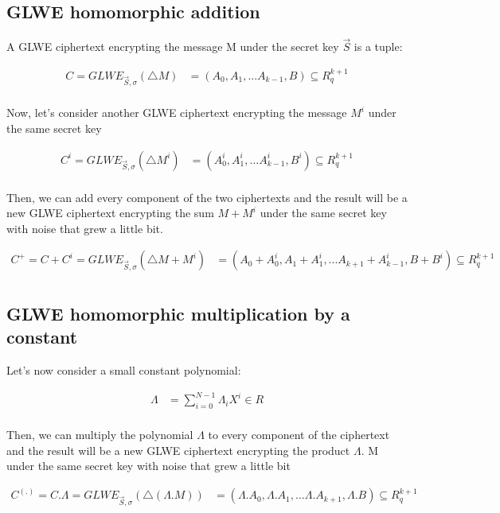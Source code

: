 \documentclass{techrep}
\theoremstyle{definition}
\theoremstyle{plain}
\begin{document}
\subsection{GLWE homomorphic addition}

A GLWE ciphertext encrypting the message M under the secret key $\overrightarrow{S}$ is a tuple:

	\begin{align*}
C = GLWE_{\overrightarrow{S},\sigma}(\bigtriangleup M)	&=	 (A_0,A_1,...A_{k-1}, B) \subseteq  R_{q}^{k+1} \\
	\end{align*}

Now, let’s consider another GLWE ciphertext encrypting the message $M^i$ under the same secret key

	\begin{align*}
C^i = GLWE_{\overrightarrow{S},\sigma}(\bigtriangleup M^i)	&=	 (A_0^i,A_1^i,...A_{k-1}^i, B^i) \subseteq  R_{q}^{k+1} \\
	\end{align*}

Then, we can add every component of the two ciphertexts and the result will be a new GLWE ciphertext encrypting the sum $M + M^i$ under the same secret key with noise that grew a little bit.

	\begin{align*}
C^+ = C+ C^i = GLWE_{\overrightarrow{S},\sigma}(\bigtriangleup M+M^i)	&=	 (A_0+A_0^i,A_1+A_1^i,...A_{k+1}+A_{k-1}^i, B+B^i) \subseteq  R_{q}^{k+1} \\
	\end{align*}

\subsection{GLWE homomorphic multiplication by a constant}
Let's now consider a small constant polynomial:

	\begin{align*}
		 \Lambda &=   \sum_{i=0}^{N-1}\Lambda_iX^i \in R  \\
	\end{align*}

Then, we can multiply the polynomial $\Lambda$ to every component of the ciphertext and the result will be a new GLWE ciphertext encrypting the product $\Lambda$. M under the same secret key with noise that grew a little bit 


	\begin{align*}
C^{(.)} = C.\Lambda = GLWE_{\overrightarrow{S},\sigma}(\bigtriangleup (\Lambda . M))	&=	 (\Lambda.A_0,\Lambda.A_1,...\Lambda.A_{k+1}, \Lambda.B) \subseteq  R_{q}^{k+1} \\
	\end{align*}
\end{document}
